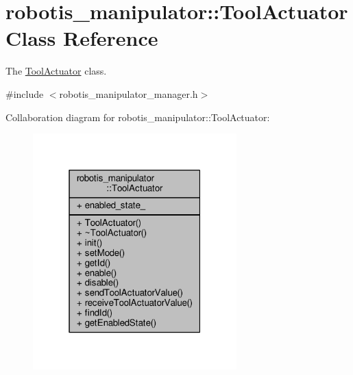 \hypertarget{classrobotis__manipulator_1_1_tool_actuator}{}\section{robotis\+\_\+manipulator\+:\+:Tool\+Actuator Class Reference}
\label{classrobotis__manipulator_1_1_tool_actuator}


The \hyperlink{classrobotis__manipulator_1_1_tool_actuator}{Tool\+Actuator} class.  




{\ttfamily \#include $<$robotis\+\_\+manipulator\+\_\+manager.\+h$>$}



Collaboration diagram for robotis\+\_\+manipulator\+:\+:Tool\+Actuator\+:\nopagebreak
\begin{figure}[H]
\begin{center}
\leavevmode
\includegraphics[width=223pt]{classrobotis__manipulator_1_1_tool_actuator__coll__graph}
\end{center}
\end{figure}
